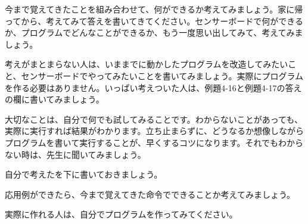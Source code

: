 \documentclass[text04.tex]{subfiles}
\begin{document}
今まで覚えてきたことを組み合わせて、何ができるか考えてみましょう。家に帰ってから、考えてみて答えを書いてきてください。センサーボードで何ができるか、プログラムでどんなことができるか、もう一度思い出してみて、考えてみましょう。

考えがまとまらない人は、いままでに動かしたプログラムを改造してみたいこと、センサーボードでやってみたいことを書いてみましょう。実際にプログラムを作る必要はありません。いっぱい考えついた人は、例題4-16と例題4-17の答えの欄に書いてみましょう。

大切なことは、自分で何でも試してみることです。わからないことがあっても、実際に実行すれば結果がわかります。立ち止まらずに、どうなるか想像しながらプログラムを書いて実行することが、早くするコツになります。それでもわからない時は、先生に聞いてみましょう。

\exampleanswer

自分で考えたを下に書いておきましょう。

応用例ができたら、今まで覚えてきた命令でできることか考えてみましょう。

実際に作れる人は、自分でプログラムを作ってみてください。


\end{document}
